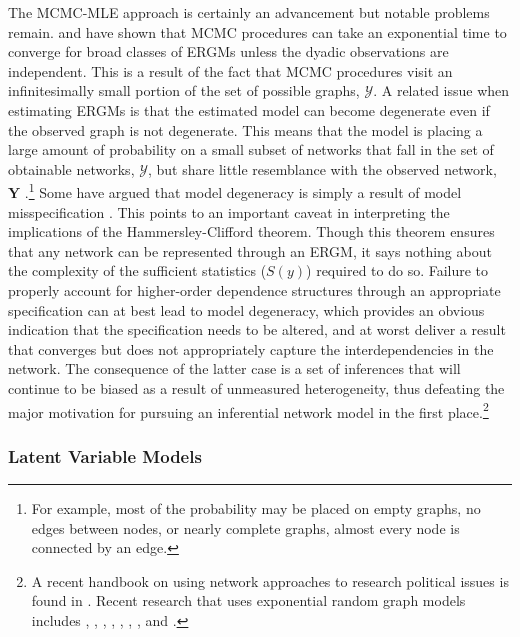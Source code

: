 The MCMC-MLE approach is certainly an advancement but notable problems remain. \citet{bhamidi:etal:2008} and \citet{chatterjee:diaconis:2013} have shown that MCMC procedures can take an exponential time to converge for broad classes of ERGMs unless the dyadic observations are independent. This is a result of the fact that MCMC procedures visit an infinitesimally small portion of the set of possible graphs, $\mathcal{Y}$. A related issue when estimating ERGMs is that the estimated model can become degenerate even if the observed graph is not degenerate. This means that the model is placing a large amount of probability on a small subset of networks that fall in the set of obtainable networks, $\mathcal{Y}$, but share little resemblance with the observed network, $\mathbf{Y}$ \citep{schweinberger:2011}.\footnote{For example, most of the probability may be placed on empty graphs, no edges between nodes, or nearly complete graphs, almost every node is connected by an edge.} Some have argued that model degeneracy is simply a result of model misspecification \citep{handcock:2003b,goodreau:etal:2008,handcock:etal:2008}. This points to an important caveat in interpreting the implications of the Hammersley-Clifford theorem. Though this theorem ensures that any network can be represented through an ERGM, it says nothing about the complexity of the sufficient statistics ($S(y)$) required to do so. Failure to properly account for higher-order dependence structures through an appropriate specification can at best lead to model degeneracy, which provides an obvious indication that the specification needs to be altered, and at worst deliver a result that converges but does not appropriately capture the interdependencies in the network. The consequence of the latter case is a set of inferences that will continue to be biased as a result of unmeasured heterogeneity, thus defeating the major motivation for pursuing an inferential network model in the first place.\footnote{A recent handbook on using network approaches to research political issues is found in \citet{victor:etal:2016}.  Recent research that uses exponential random graph models includes \citet{victor:ringe:2009}, \citet{berardo:scholz:2010}, \citet{calvo:leiras:2012}, \citet{lubell:etal:2012}, \citet{robbins:etal:2012}, \citet{aleman:calvo:2013}, \citet{heaney:2014}, and \citet{kirkland:williams:2014}.}

\subsubsection{\textbf{Latent Variable Models}}

